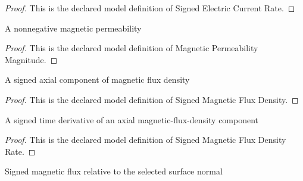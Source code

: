 \begin{proof}
  This is the declared model definition of Signed Electric Current Rate.
\end{proof}
\begin{definition}
  \label{def:physics:phyx-mini-0930:phyxminiproblems-problemphyxmini0930-magneticpermeabilitymagnitude}
  A nonnegative magnetic permeability
\end{definition}
\begin{proof}
  This is the declared model definition of Magnetic Permeability Magnitude.
\end{proof}
\begin{definition}
  \label{def:physics:phyx-mini-0930:phyxminiproblems-problemphyxmini0930-signedmagneticfluxdensity}
  A signed axial component of magnetic flux density
\end{definition}
\begin{proof}
  This is the declared model definition of Signed Magnetic Flux Density.
\end{proof}
\begin{definition}
  \label{def:physics:phyx-mini-0930:phyxminiproblems-problemphyxmini0930-signedmagneticfluxdensityrate}
  A signed time derivative of an axial magnetic-flux-density component
\end{definition}
\begin{proof}
  This is the declared model definition of Signed Magnetic Flux Density Rate.
\end{proof}
\begin{definition}
  \label{def:physics:phyx-mini-0930:phyxminiproblems-problemphyxmini0930-signedmagneticflux}
  Signed magnetic flux relative to the selected surface normal
\end{definition}
